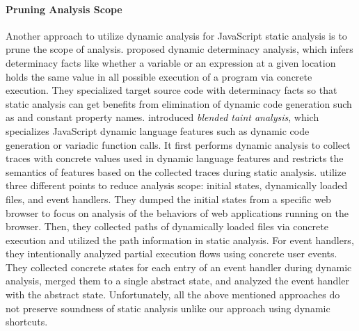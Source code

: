 \paragraph{Pruning Analysis Scope}
Another approach to utilize dynamic analysis for JavaScript static analysis is
to prune the scope of analysis.  \citet{determinacy} proposed dynamic
determinacy analysis, which infers determinacy facts like whether a
variable or an expression at a given location holds the same value in
all possible execution of a program via concrete execution.
They specialized target source code with determinacy
facts so that static analysis can get benefits from elimination of dynamic code
generation such as  and constant property names.
\citet{blended} introduced \textit{blended taint analysis}, which specializes JavaScript dynamic
language features such as dynamic code generation or variadic function calls.
It first performs dynamic analysis to collect traces with concrete values used
in dynamic language features and restricts the semantics of features based on the
collected traces during static analysis.  \citet{battles, eha} utilize three different points to reduce
analysis scope: initial states, dynamically loaded files, and event handlers.
They dumped the initial states from a specific web browser to focus on
analysis of the behaviors of web applications running on the browser.
Then, they collected paths of dynamically loaded files via concrete
execution and utilized the path information in static analysis.
For event handlers, they intentionally analyzed partial execution flows using concrete user events.
They collected concrete states for each entry of an event handler
during dynamic analysis, merged them to a single abstract state, and analyzed
the event handler with the abstract state.
Unfortunately, all the above mentioned approaches do not preserve
soundness of static analysis unlike our approach using dynamic shortcuts.


% 

% 
